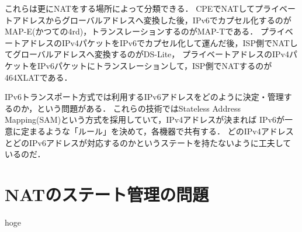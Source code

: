 これらは更にNATをする場所によって分類できる．
CPEでNATしてプライベートアドレスからグローバルアドレスへ変換した後，IPv6でカプセル化するのがMAP-E(かつての4rd)，トランスレーションするのがMAP-Tである．
プライベートアドレスのIPv4パケットをIPv6でカプセル化して運んだ後，ISP側でNATしてグローバルアドレスへ変換するのがDS-Lite，
プライベートアドレスのIPv4パケットをIPv6パケットにトランスレーションして，ISP側でNATするのが464XLATである．

IPv6トランスポート方式では利用するIPv6アドレスをどのように決定・管理するのか，という問題がある．
これらの技術ではStateless Address Mapping(SAM)という方式を採用していて，IPv4アドレスが決まれば
IPv6が一意に定まるような「ルール」を決めて，各機器で共有する．
どのIPv4アドレスとどのIPv6アドレスが対応するのかというステートを持たないように工夫しているのだ．

\section{NATのステート管理の問題}

hoge



